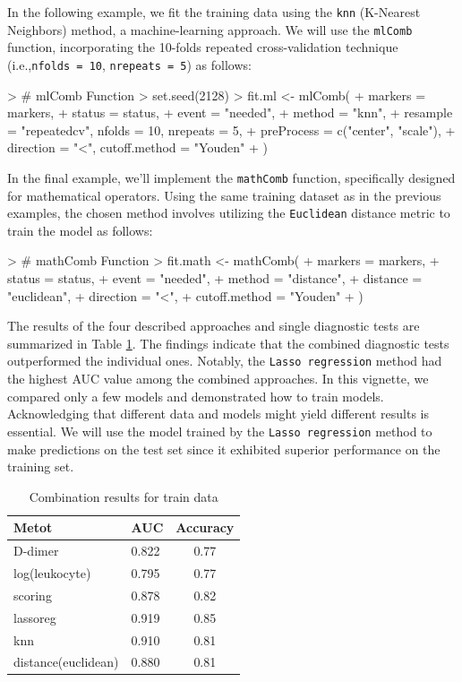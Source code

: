 \documentclass[10pt]{article}
\begin{document}
In the following example, we fit the training data using the \texttt{knn} (K-Nearest Neighbors) method, a machine-learning approach. We will use the \texttt{mlComb} function, incorporating the 10-folds repeated cross-validation technique (i.e.,\texttt{nfolds = 10}, \texttt{nrepeats = 5}) as follows:
\begin{Schunk}
\begin{Sinput}
> # mlComb Function
> set.seed(2128)
> fit.ml <- mlComb(
+   markers = markers,
+   status = status,
+   event = "needed",
+   method = "knn",
+   resample = "repeatedcv", nfolds = 10, nrepeats = 5,
+   preProcess = c("center", "scale"),
+   direction = "<", cutoff.method = "Youden"
+ )
\end{Sinput}
\end{Schunk}
In the final example, we'll implement the \texttt{mathComb} function, specifically designed for mathematical operators. Using the same training dataset as in the previous examples, the chosen method involves utilizing the \texttt{Euclidean} distance metric to train the model as follows:
\begin{Schunk}
\begin{Sinput}
> # mathComb Function
> fit.math <- mathComb(
+   markers = markers,
+   status = status,
+   event = "needed",
+   method = "distance",
+   distance = "euclidean",
+   direction = "<",
+   cutoff.method = "Youden"
+ )
\end{Sinput}
\end{Schunk}
The results of the four described approaches and single diagnostic tests are summarized in Table \ref{tbl:Res}. The findings indicate that the combined diagnostic tests outperformed the individual ones. Notably, the \texttt{Lasso regression} method had the highest AUC value among the combined approaches. In this vignette, we compared only a few models and demonstrated how to train models. Acknowledging that different data and models might yield different results is essential. We will use the model trained by the \texttt{Lasso regression} method to make predictions on the test set since it exhibited superior performance on the training set.
\begin{table}[!ht]
\centering
\caption{Combination results for train data}
\label{tbl:Res}
\begin{tabular}{p{4cm}p{2cm}c}
\toprule
Metot & AUC & Accuracy \\
\midrule
D-dimer & 0.822 & 0.77 \\
log(leukocyte) & 0.795 & 0.77 \\
scoring & 0.878 & 0.82 \\
lassoreg & 0.919 & 0.85 \\
knn & 0.910 & 0.81 \\
distance(euclidean) & 0.880 & 0.81 \\
\bottomrule
\end{tabular}
\end{table}
\end{document}
